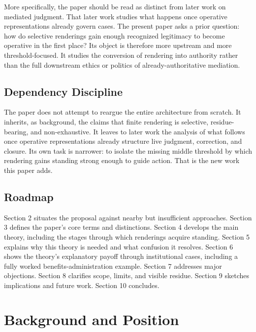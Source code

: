 \documentclass[11pt]{article}
\begin{document}
More specifically, the paper should be read as distinct from later work on mediated judgment.\cite{Swanson2026MediatedJudgmentConstraint} That later work studies what happens once operative representations already govern cases. The present paper asks a prior question: how do selective renderings gain enough recognized legitimacy to become operative in the first place? Its object is therefore more upstream and more threshold-focused. It studies the conversion of rendering into authority rather than the full downstream ethics or politics of already-authoritative mediation.

\subsection{Dependency Discipline}

The paper does not attempt to reargue the entire architecture from scratch. It inherits, as background, the claims that finite rendering is selective, residue-bearing, and non-exhaustive.\cite{Swanson2026ConstrainedDescribability,Swanson2026ConstraintConditionDisclosure} It leaves to later work the analysis of what follows once operative representations already structure live judgment, correction, and closure.\cite{Swanson2026MediatedJudgmentConstraint} Its own task is narrower: to isolate the missing middle threshold by which rendering gains standing strong enough to guide action. That is the new work this paper adds.

\subsection{Roadmap}

Section 2 situates the proposal against nearby but insufficient approaches. Section 3 defines the paper's core terms and distinctions. Section 4 develops the main theory, including the stages through which renderings acquire standing. Section 5 explains why this theory is needed and what confusion it resolves. Section 6 shows the theory's explanatory payoff through institutional cases, including a fully worked benefits-administration example. Section 7 addresses major objections. Section 8 clarifies scope, limits, and visible residue. Section 9 sketches implications and future work. Section 10 concludes.

\section{Background and Position}
\end{document}
